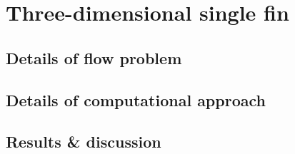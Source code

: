 \newpage
\section{Three-dimensional single fin}
\label{chapter-3Dsinglefin}
%

\subsection{Details of flow problem}

\subsection{Details of computational approach}

\subsection{Results \& discussion}
